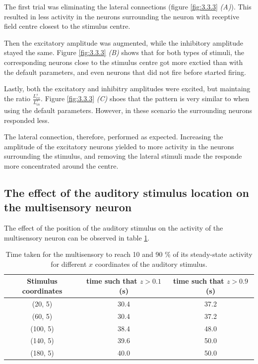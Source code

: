 \documentclass[12pt]{article}
\begin{document}
The first trial was eliminating the lateral connections (figure \ref{fig:3.3.3} \textit{(A)}). This resulted in less activity in the neurons surrounding the neuron with receptive field centre closest to the stimulus centre.

Then the excitatory amplitude was augmented, while the inhibitory amplitude stayed the same. Figure \ref{fig:3.3.3} \textit{(B)} shows that for both types of stimuli, the corresponding neurons close to the stimulus centre got more exctied than with the default parameters, and even neurons that did not fire before started firing.

Lastly, both the excitatory and inhibitry amplitudes were excited, but maintaing the ratio $\frac{L_{ex}^s}{L_{in}^s}$. Figure \ref{fig:3.3.3} \textit{(C)} shoes that the pattern is very similar to when using the default parameters. However, in these scenario the surrounding neurons responded less.

The lateral connection, therefore, performed as expected. Increasing the amplitude of the excitatory neurons yielded to more activity in the neurons surrounding the stimulus, and removing the lateral stimuli made the responde more concentrated around the centre.

\subsection{The effect of the auditory stimulus location on the multisensory neuron}

The effect of the position of the auditory stimulus on the activity of the multisensory neuron can be observed in table \ref{tab:1}.

\begin{center}
 \begin{table}
 \begin{tabular}{|c | c | c |}
 \hline
 Stimulus coordinates & time such that $z > 0.1$ (s) & time such that $z > 0.9$ (s) \\ [0.5ex]
 \hline\hline
 (20, 5) & 30.4 & 37.2 \\
 \hline
 (60, 5) & 30.4 & 37.2 \\
 \hline
 (100, 5) & 38.4 & 48.0  \\
 \hline
 (140, 5) & 39.6 & 50.0 \\
 \hline
 (180, 5) & 40.0 & 50.0  \\ [1ex]
 \hline
 \end{tabular}
 \caption{Time taken for the multisensory to reach 10 and 90 \% of its steady-state activity for different $x$ coordinates of the auditory stimulus.}
 \label{tab:1}
 \end{table}
\end{center}
\end{document}
